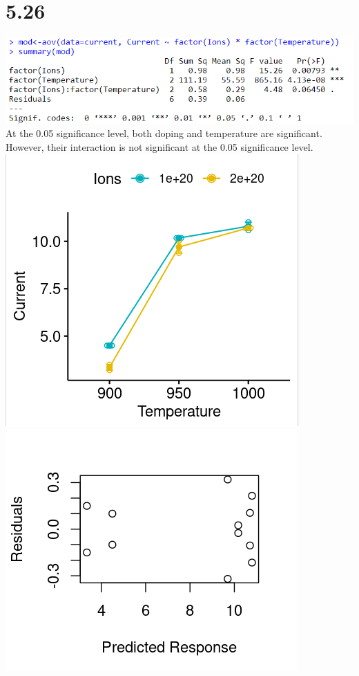 \documentclass{article}
\begin{document}
\section*{5.26}
\includegraphics{5.26a.PNG}
\\At the 0.05 significance level, both doping and temperature are significant. However, their interaction is not significant at the 0.05 significance level.
\\\includegraphics{5.26b.PNG}
\\\includegraphics{5.26cRes.PNG}
\end{document}
